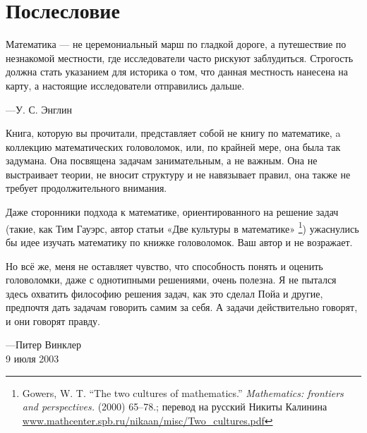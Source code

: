 \chapter*{Послесловие}

\setlength{\epigraphwidth}{.6\textwidth}
\epigraph{Математика --- не церемониальный марш по гладкой дороге, а путешествие по незнакомой местности, где исследователи часто рискуют заблудиться.
Строгость должна стать указанием для историка о том, что данная местность нанесена на карту, а настоящие исследователи отправились дальше.}{---У. С. Энглин
}

Книга, которую  вы прочитали, представляет собой не книгу по математике, a коллекцию математических головоломок, или, по крайней мере, она была так задумана.
Она посвящена задачам занимательным, а не важным.
Она не выстраивает теории, не вносит структуру и не навязывает правил, она также не требует продолжительного внимания.

Даже сторонники  подхода к математике, ориентированного на решение задач (такие, как Тим Гауэрс, автор статьи «Две культуры в математике»%
\footnote{Gowers, W. T. ``The two cultures of mathematics.'' \emph{Mathematics: frontiers and perspectives.} (2000) 65--78.; перевод на русский Никиты Калинина \href{http://www.mathcenter.spb.ru/nikaan/misc/Two_cultures.pdf}{\url{www.mathcenter.spb.ru/nikaan/misc/Two_cultures.pdf}}})
ужаснулись бы идее изучать математику по книжке головоломок.
Ваш автор и не возражает.

Но всё же, меня не оставляет чувство, что способность понять и оценить головоломки, даже с однотипными решениями, очень полезна.
Я не пытался здесь охватить  философию решения задач, как это сделал Пойа и другие, предпочтя дать задачам говорить самим за себя.
А задачи действительно говорят, и они говорят правду.

\begin{flushright}
---Питер Винклер
\\
9 июля 2003
\end{flushright}
